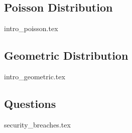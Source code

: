\documentclass{exam}
\begin{document}
\subsection{Poisson Distribution}
{intro_poisson.tex}
\subsection{Geometric Distribution}
{intro_geometric.tex}
\subsection{Questions}
\begin{questions}
{security_breaches.tex}
\end{questions}
\end{document}
